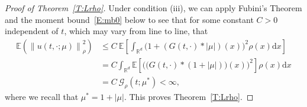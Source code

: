 \documentclass[a4paper,11pt]{article}%
\theoremstyle{plain}
\theoremstyle{definition}
\numberwithin{equation}{section}
\newcommand{\R}{\mathbb{R}}
\newcommand{\E}{\mathbb{E}}
\newcommand{\Norm}[1]{\left\| #1 \right\|}
\newcommand{\ud}{\ensuremath{\mathrm{d}}}
\begin{document}
\begin{proof}[Proof of Theorem~\ref{T:Lrho}]
  Under condition (iii), we can apply Fubini's Theorem and the moment bound~\eqref{E:mb0} below to
  see that for some constant $C>0$ independent of $t$, which may vary from line to line, that
  \begin{align*}
    \E\left(\Norm{u(t,\cdot;\mu)}_{\rho}^2\right)
    & \le C\: \E \left[\int_{\R^d}\bigg(1+(G(t,\cdot) * |\mu|)(x)\bigg)^2\rho(x)\ud x\right] \\
    & = C \int_{\R^d}\E \left[\bigg(\Big(G(t,\cdot) *(1+|\mu|)\Big)(x) \bigg)^2\right]\rho(x)\ud x \\
    & = C \:\mathcal{G}_{\rho}(t;\mu^*) < \infty,
  \end{align*}
  where we recall that $\mu^* = 1+|\mu|$. This proves Theorem~\ref{T:Lrho}.
\end{proof}
\end{document}
